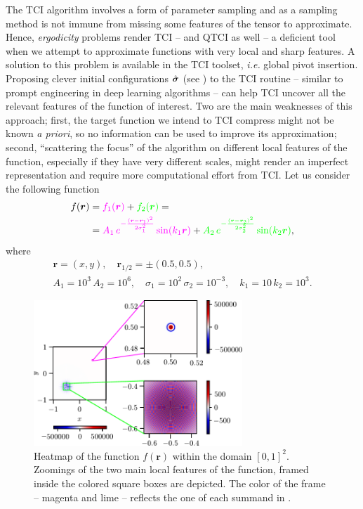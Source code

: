 The TCI algorithm involves a form of parameter sampling and as a sampling method is not immune from missing some features of the tensor to approximate. Hence, \textit{ergodicity} problems render TCI -- and QTCI as well -- a deficient tool when we attempt to approximate functions with very local and sharp features. 
A solution to this problem is available in the TCI toolset, \emph{i.e.} global pivot insertion. Proposing clever initial configurations $\hat{\boldsymbol{\sigma}}$ (see ) to the TCI routine -- similar to prompt engineering in deep learning algorithms -- can help TCI uncover all the relevant features of the function of interest. Two are the main weaknesses of this approach; first, the target function we intend to TCI compress might not be known \emph{a priori}, so no information can be used to improve its approximation; second, ``scattering the focus'' of the algorithm on different local features of the function, especially if they have very different scales, might render an imperfect representation and require more computational effort from TCI. 
Let us consider the following function 
\begin{gather}
	\begin{aligned}
		f(\boldsymbol{r}) &={\color{mymagenta}f_1(\boldsymbol{r})} + {\color{green} f_2(\boldsymbol{r})} =\\ 
		&={\color{mymagenta} A_1\, e^{-\frac{(\boldsymbol{r} - \boldsymbol{r}_1)^2}{2\sigma^2_1}} \sin(k_1\boldsymbol{r})} + {\color{green} A_2\, e^{-\frac{(\boldsymbol{r} - \boldsymbol{r}_2)^2}{2\sigma^2_2}} \sin(k_2\boldsymbol{r})},
		\label{eq:localFunc}
	\end{aligned}
\end{gather}
	where
\[
\begin{gathered}
	\boldsymbol{r} = (x,y), \quad \boldsymbol{r}_{1/2} = \pm( 0.5, 0.5),\\[6pt]
	A_1 = 10^{3}\, A_2 = 10^6, \quad \sigma_1 = 10^{2}\, \sigma_2 = 10^{-3}, \quad k_1 = 10\, k_2 = 10^3. 
\end{gathered}
\]
\begin{figure}[ht!]
	\centering
	\includegraphics[width=0.7\textwidth]{figures/Heatmap_localised_func.pdf}
	\caption{Heatmap of the function $f(\boldsymbol{r})$ within the domain $[0,1]^2$. Zoomings of the two main local features of the function, framed inside the colored square boxes are depicted. The color of the frame  -- {\color{mymagenta} magenta} and {\color{green} lime} -- reflects the one of each summand in .}
	\label{fig:localFunc}
\end{figure}

